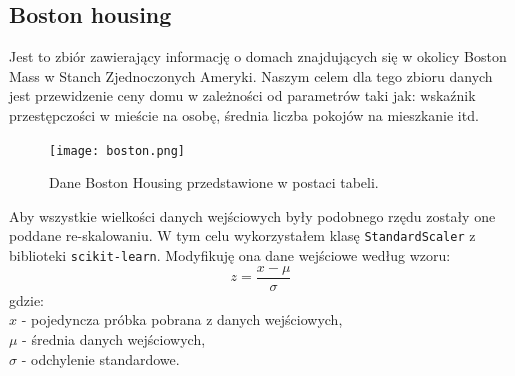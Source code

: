 \documentclass{article}
\begin{document}
\subsection{Boston housing}
Jest to zbiór zawierający informację o domach znajdujących się w okolicy Boston Mass w Stanch
Zjednoczonych Ameryki. Naszym celem dla tego zbioru danych jest przewidzenie ceny
domu w zależności od parametrów taki jak: wskaźnik przestępczości w mieście na osobę, 
średnia liczba pokojów na mieszkanie itd.

\begin{figure}[H]
\centering
\texttt{[image: boston.png]}
\caption{Dane Boston Housing przedstawione w postaci tabeli.}
\end{figure}

Aby wszystkie wielkości danych wejściowych były podobnego rzędu  zostały one poddane 
re-skalowaniu.
W tym celu wykorzystałem klasę \texttt{StandardScaler} z biblioteki \texttt{scikit-learn}.
Modyfikuję ona dane wejściowe według wzoru:
\begin{equation}
	z = \frac{x - \mu}{\sigma}
\end{equation}
gdzie:\\
$x$ - pojedyncza próbka pobrana z danych wejściowych,\\
$\mu$ - średnia danych wejściowych,\\
$\sigma$ - odchylenie standardowe.\\
\end{document}

